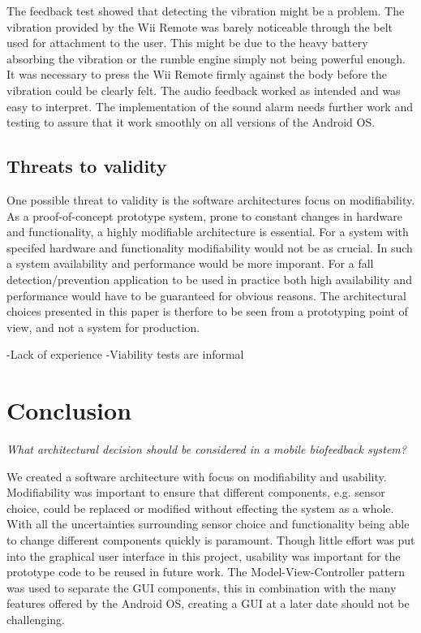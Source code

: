 The feedback test showed that detecting the vibration might be a problem. The vibration provided by the Wii Remote was barely noticeable through the belt used for attachment to the user. This might be due to the heavy battery absorbing the vibration or the rumble engine simply not being powerful enough. It was necessary to press the Wii Remote firmly against the body before the vibration could be clearly felt. The audio feedback worked as intended and was easy to interpret. The implementation of the sound alarm needs further work and testing to assure that it work smoothly on all versions of the Android OS.

\subsection{Threats to validity}
One possible threat to validity is the software architectures focus on modifiability. As a proof-of-concept prototype system, prone to constant changes in hardware and functionality, a highly modifiable architecture is essential. For a system with specifed hardware and functionality modifiability would not be as crucial. In such a system availability and performance would be more imporant. For a fall detection/prevention application to be used in practice both high availability and performance would have to be guaranteed for obvious reasons. The architectural choices presented in this paper is therfore to be seen from a prototyping point of view, and not a system for production.

-Lack of experience
-Viability tests are informal


\section{Conclusion}

\textit{What architectural decision should be considered in a mobile biofeedback system?}


We created a software architecture with focus on modifiability and usability. Modifiability was important to ensure that different components, e.g. sensor choice, could be replaced or modified without effecting the system as a whole. With all the uncertainties surrounding sensor choice and functionality being able to change different components quickly is paramount. Though little effort was put into the graphical user interface in this project, usability was important for the prototype code to be reused in future work. The Model-View-Controller pattern was used to separate the GUI components, this in combination with the many features offered by the Android OS, creating a GUI at a later date should not be challenging.


